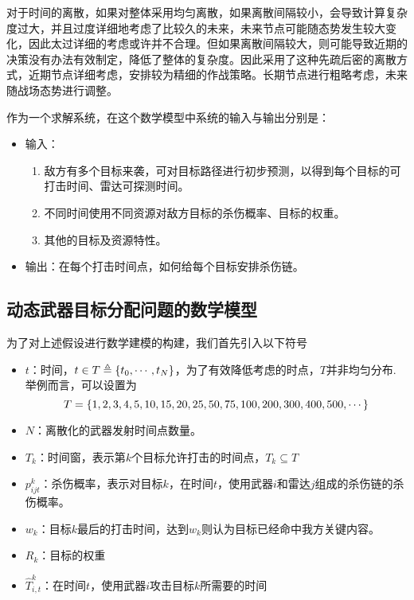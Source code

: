 对于时间的离散，如果对整体采用均匀离散，如果离散间隔较小，会导致计算复杂度过大，并且过度详细地考虑了比较久的未来，未来节点可能随态势发生较大变化，因此太过详细的考虑或许并不合理。但如果离散间隔较大，则可能导致近期的决策没有办法有效制定，降低了整体的复杂度。因此采用了这种先疏后密的离散方式，近期节点详细考虑，安排较为精细的作战策略。长期节点进行粗略考虑，未来随战场态势进行调整。

作为一个求解系统，在这个数学模型中系统的输入与输出分别是：
\begin{itemize}
    \item 输入：
    \begin{enumerate}
        \item 敌方有多个目标来袭，可对目标路径进行初步预测，以得到每个目标的可打击时间、雷达可探测时间。
        \item 不同时间使用不同资源对敌方目标的杀伤概率、目标的权重。
        \item 其他的目标及资源特性。
    \end{enumerate}
    \item 输出：在每个打击时间点，如何给每个目标安排杀伤链。
\end{itemize}



\subsection{动态武器目标分配问题的数学模型}
为了对上述假设进行数学建模的构建，我们首先引入以下符号
\begin{itemize}
    \item $t$：时间，$t \in T \triangleq \{t_0,\cdots,t_N\}$，为了有效降低考虑的时点，$T$并非均匀分布. 举例而言，可以设置为\begin{equation*}
        T = \{1,2,3,4,5,10,15,20,25,50,75,100,200,300,400,500,\cdots\}
    \end{equation*}
    \item $N$：离散化的武器发射时间点数量。
    \item $T_k$：时间窗，表示第$k$个目标允许打击的时间点，$T_k \subseteq T$
    \item $p_{ijt}^k$：杀伤概率，表示对目标$k$，在时间$t$，使用武器$i$和雷达$j$组成的杀伤链的杀伤概率。
    \item $w_k$：目标$k$最后的打击时间，达到$w_k$则认为目标已经命中我方关键内容。
    \item $R_k$：目标的权重
    \item $\hat{T}_{i,t}^k$：在时间$t$，使用武器$i$攻击目标$k$所需要的时间
\end{itemize}


